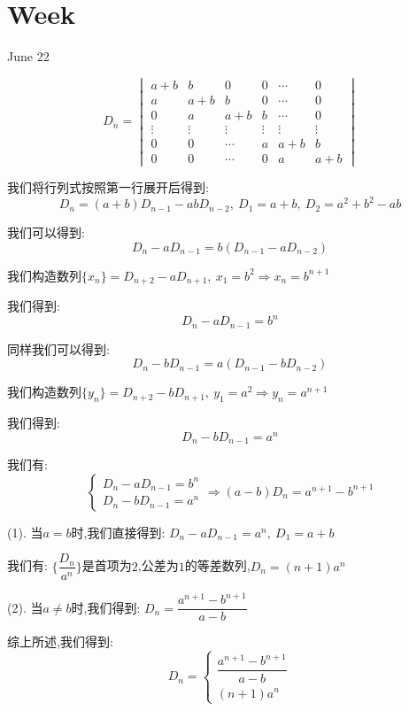 \section{Week }
\textcolor{purplea}{June 22}

\begin{example}[][Exam: 32.4.1]
	$$D_{n} =
\begin{vmatrix}
	a+b&b&0&0&\cdots&0\\
	a&a+b&b&0&\cdots&0\\
	0&a&a+b&b&\cdots&0\\
	\vdots&\vdots&\vdots&\vdots&\vdots&\vdots\\
	0&0&\cdots&a&a+b&b\\
	0&0&\cdots&0&a&a+b
\end{vmatrix}$$
\end{example}

\begin{solution}
	
	我们将行列式按照第一行展开后得到: 
	$$D_{n}=(a+b)D_{n-1}-abD_{n-2},\ D_{1}=a+b,\ D_{2}=a^2+b^2-ab$$
	
	我们可以得到: 
	$$D_{n}-aD_{n-1}=b(D_{n-1}-aD_{n-2})$$
	
	我们构造数列$\{x_{n}\}=D_{n+2}-aD_{n+1},\ x_{1}=b^2\Rightarrow x_{n}=b^{n+1}$
	
	我们得到: 
	$$D_{n}-aD_{n-1}=b^n$$
	
	同样我们可以得到: 
	$$D_{n}-bD_{n-1}=a(D_{n-1}-bD_{n-2})$$
	
	我们构造数列$\{y_{n}\}=D_{n+2}-bD_{n+1},\ y_{1}=a^2\Rightarrow y_{n}=a^{n+1}$
	
	我们得到: 
	$$D_{n}-bD_{n-1}=a^n$$
	
	我们有: $$\left\lbrace
	\begin{array}{l}
		D_{n}-aD_{n-1}=b^n\\
		D_{n}-bD_{n-1}=a^n
	\end{array}
	\right. \Rightarrow (a-b)D_{n}=a^{n+1}-b^{n+1}$$
	
	(1). 当$a=b$时,我们直接得到: $D_{n}-aD_{n-1}=a^n,\ D_{1}=a+b$
	
	我们有: $\{\dfrac{D_{n}}{a^n}\}$是首项为$2$,公差为$1$的等差数列,$D_{n}=(n+1)a^n$
	
	(2). 当$a\neq b$时,我们得到: $D_{n}=\dfrac{a^{n+1}-b^{n+1}}{a-b}$
	
	综上所述,我们得到: 
	$$D_{n}=\left\lbrace
	\begin{array}{l}
		\dfrac{a^{n+1}-b^{n+1}}{a-b}\\
		(n+1)a^n
	\end{array}
	\right. $$
\end{solution}

